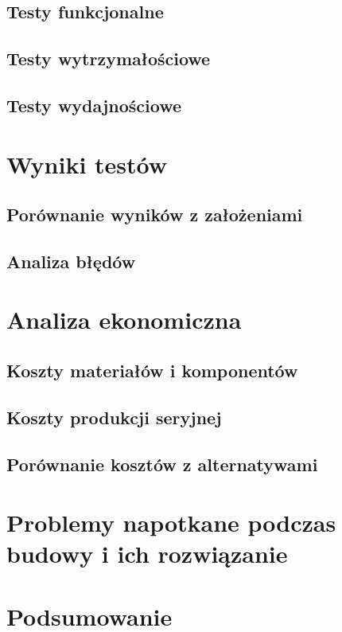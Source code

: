     \subsection{Testy funkcjonalne}
      \noindent\lipsum[1-3]

    \subsection{Testy wytrzymałościowe}
      \noindent\lipsum[4-7]

    \subsection{Testy wydajnościowe}
      \noindent\lipsum[8-10]

\clearpage\section{Wyniki testów}
  \noindent\lipsum[1-7]

    \subsection{Porównanie wyników z założeniami}
      \noindent\lipsum[1-3]

    \subsection{Analiza błędów}
      \noindent\lipsum[4-6]

\clearpage\section{Analiza ekonomiczna}  
  \noindent\lipsum[1-7]

  \subsection{Koszty materiałów i komponentów}
    \noindent\lipsum[1-3]

  \subsection{Koszty produkcji seryjnej}
    \noindent\lipsum[4-7]

  \subsection{Porównanie kosztów z alternatywami}
    \noindent\lipsum[8-10]

\clearpage\section{Problemy napotkane podczas budowy i ich rozwiązanie}
\noindent \lipsum[1-5]

\clearpage\section*{Podsumowanie}
    \noindent \lipsum[1-9]